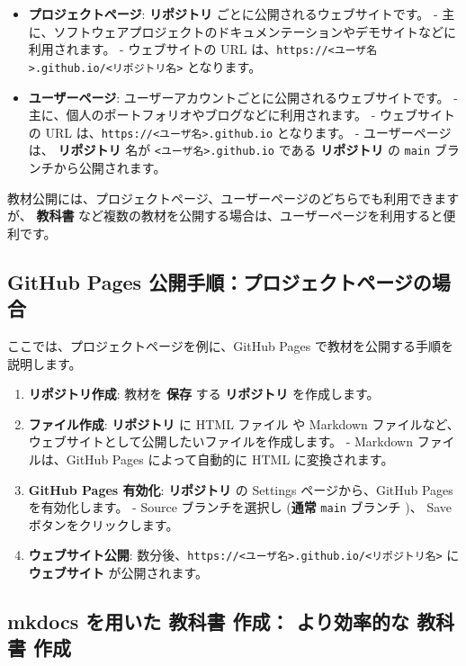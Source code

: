 \begin{itemize}
    \item \textbf{プロジェクトページ}:  \textbf{リポジトリ} ごとに公開されるウェブサイトです。
        - 主に、ソフトウェアプロジェクトのドキュメンテーションやデモサイトなどに利用されます。
        - ウェブサイトの URL は、\texttt{https://<ユーザ名>.github.io/<リポジトリ名>} となります。
    \item \textbf{ユーザーページ}: ユーザーアカウントごとに公開されるウェブサイトです。
        - 主に、個人のポートフォリオやブログなどに利用されます。
        - ウェブサイトの URL は、\texttt{https://<ユーザ名>.github.io} となります。
        - ユーザーページは、 \textbf{リポジトリ} 名が \texttt{<ユーザ名>.github.io} である \textbf{リポジトリ} の \texttt{main} ブランチから公開されます。
\end{itemize}

教材公開には、プロジェクトページ、ユーザーページのどちらでも利用できますが、 \textbf{教科書} など複数の教材を公開する場合は、ユーザーページを利用すると便利です。

\subsection{GitHub Pages 公開手順：プロジェクトページの場合}

ここでは、プロジェクトページを例に、GitHub Pages で教材を公開する手順を説明します。

\begin{enumerate}
    \item \textbf{リポジトリ作成}: 教材を \textbf{保存} する \textbf{リポジトリ} を作成します。
    \item \textbf{ファイル作成}:  \textbf{リポジトリ} に HTML ファイル や Markdown ファイルなど、ウェブサイトとして公開したいファイルを作成します。
        - Markdown ファイルは、GitHub Pages によって自動的に HTML に変換されます。
    \item \textbf{GitHub Pages 有効化}:  \textbf{リポジトリ} の Settings ページから、GitHub Pages を有効化します。
        - Source ブランチを選択し (\textbf{通常} \texttt{main} ブランチ )、 Save ボタンをクリックします。
    \item \textbf{ウェブサイト公開}: 数分後、\texttt{https://<ユーザ名>.github.io/<リポジトリ名>} に \textbf{ウェブサイト} が公開されます。
\end{enumerate}

\subsection{mkdocs を用いた \textbf{教科書} 作成： \textbf{より効率的な} \textbf{教科書} 作成}

